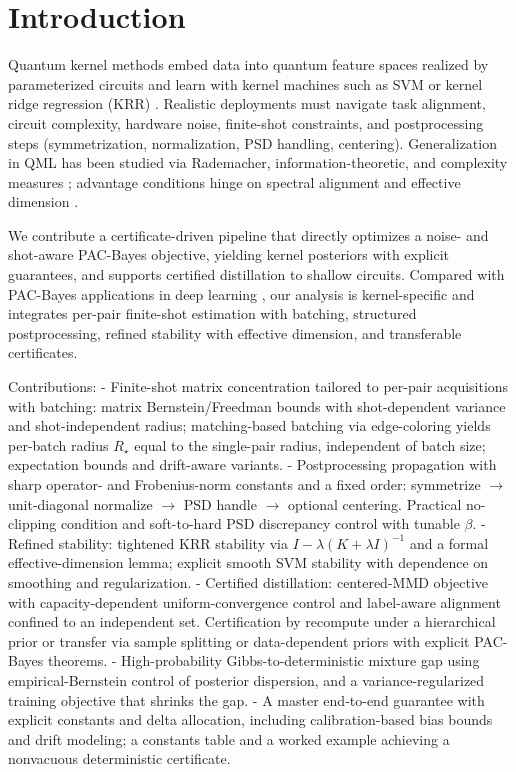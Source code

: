 \documentclass{article}
\begin{document}
\section{Introduction}
Quantum kernel methods embed data into quantum feature spaces realized by parameterized circuits and learn with kernel machines such as SVM or kernel ridge regression (KRR) \cite{schuld2019quantum, havlivcek2019supervised, blank2020quantum}. Realistic deployments must navigate task alignment, circuit complexity, hardware noise, finite-shot constraints, and postprocessing steps (symmetrization, normalization, PSD handling, centering). Generalization in QML has been studied via Rademacher, information-theoretic, and complexity measures \cite{caro2021generalization, bu2021statistical, banchi2021generalization, sutter2022quantum}; advantage conditions hinge on spectral alignment and effective dimension \cite{huang2021power, gentinetta2022complexity}.

We contribute a certificate-driven pipeline that directly optimizes a noise- and shot-aware PAC-Bayes objective, yielding kernel posteriors with explicit guarantees, and supports certified distillation to shallow circuits. Compared with PAC-Bayes applications in deep learning \cite{dziugaite2017computing, dziugaite2018data}, our analysis is kernel-specific and integrates per-pair finite-shot estimation with batching, structured postprocessing, refined stability with effective dimension, and transferable certificates.

Contributions:
- Finite-shot matrix concentration tailored to per-pair acquisitions with batching: matrix Bernstein/Freedman bounds with shot-dependent variance and shot-independent radius; matching-based batching via edge-coloring yields per-batch radius $R_\star$ equal to the single-pair radius, independent of batch size; expectation bounds and drift-aware variants.
- Postprocessing propagation with sharp operator- and Frobenius-norm constants and a fixed order: symmetrize $\rightarrow$ unit-diagonal normalize $\rightarrow$ PSD handle $\rightarrow$ optional centering. Practical no-clipping condition and soft-to-hard PSD discrepancy control with tunable $\beta$.
- Refined stability: tightened KRR stability via $I-\lambda(K+\lambda I)^{-1}$ and a formal effective-dimension lemma; explicit smooth SVM stability with dependence on smoothing and regularization.
- Certified distillation: centered-MMD objective with capacity-dependent uniform-convergence control and label-aware alignment confined to an independent set. Certification by recompute under a hierarchical prior or transfer via sample splitting or data-dependent priors with explicit PAC-Bayes theorems.
- High-probability Gibbs-to-deterministic mixture gap using empirical-Bernstein control of posterior dispersion, and a variance-regularized training objective that shrinks the gap.
- A master end-to-end guarantee with explicit constants and delta allocation, including calibration-based bias bounds and drift modeling; a constants table and a worked example achieving a nonvacuous deterministic certificate.
\end{document}
